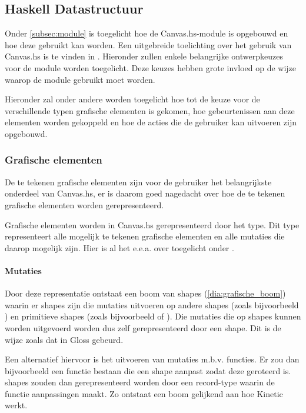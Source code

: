 \subsection{Haskell Datastructuur} \label{subsec:grafische_bibliotheek}
Onder \autoref{subsec:module} is toegelicht hoe de Canvas.hs-module is opgebouwd en hoe deze gebruikt kan worden. Een uitgebreide toelichting over het gebruik van Canvas.hs is te vinden in . Hieronder zullen enkele belangrijke ontwerpkeuzes voor de module worden toegelicht. Deze keuzes hebben grote invloed op de wijze waarop de module gebruikt moet worden. 

Hieronder zal onder andere worden toegelicht hoe tot de keuze voor de verschillende typen grafische elementen is gekomen, hoe gebeurtenissen aan deze elementen worden gekoppeld en hoe de acties die de gebruiker kan uitvoeren zijn opgebouwd.

\subsubsection{Grafische elementen}
De te tekenen grafische elementen zijn voor de gebruiker het belangrijkste onderdeel van Canvas.hs, er is daarom goed nagedacht over hoe de te tekenen grafische elementen worden gerepresenteerd. 

Grafische elementen worden in Canvas.hs gerepresenteerd door het type. Dit type representeert alle mogelijk te tekenen grafische elementen en alle mutaties die daarop mogelijk zijn. Hier is al het e.e.a. over toegelicht onder .

\paragraph{Mutaties}
Door deze representatie ontstaat een boom van shapes (\autoref{dia:grafische_boom}) waarin er shapes zijn die mutaties uitvoeren op andere shapes (zoals bijvoorbeeld ) en primitieve shapes (zoals bijvoorbeeld  of ). Die mutaties die op shapes kunnen worden uitgevoerd worden dus zelf gerepresenteerd door een shape. Dit is de wijze zoals dat in Gloss gebeurd.

Een alternatief hiervoor is het uitvoeren van mutaties m.b.v. functies. Er zou dan bijvoorbeeld een functie  bestaan die een shape aanpast zodat deze geroteerd is. shapes zouden dan gerepresenteerd worden door een record-type waarin de functie aanpassingen maakt. Zo ontstaat een boom gelijkend aan hoe Kinetic werkt.

